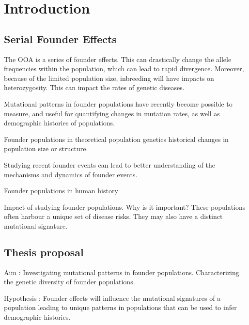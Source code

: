 \documentclass[
11pt, %
oneside, %
english, %
doublespacing, %
headsepline, %
]{MastersDoctoralThesis} %
\begin{document}

\mainmatter %

\pagestyle{thesis} %


\section{Introduction}

\subsection{Serial Founder Effects}
The OOA is a series of founder effects.
This can drastically change the allele frequencies within the population, which can lead to rapid divergence.
Moreover, because of the limited population size, inbreeding will have impacts on heterozygosity.
This can impact the rates of genetic diseases.

Mutational patterns in founder populations have recently become possible to measure, and useful for quantifying changes in mutation rates, as well as demographic histories of populations.

Founder populations in theoretical population genetics
historical changes in population size or structure.

Studying recent founder events can lead to better understanding of the mechanisms and dynamics of founder events. 

Founder populations in human history

Impact of studying founder populations. Why is it important?
These populations often harbour a unique set of disease risks.
They may also have a distinct mutational signature.


\subsection{Thesis proposal}
Aim : Investigating mutational patterns in founder populations. 
Characterizing the genetic diversity of founder populations. 

Hypothesis : 
Founder effects will influence the mutational signatures of a population leading to unique patterns in populations that can be used to infer demographic histories.
\end{document}
